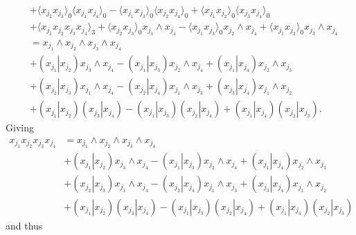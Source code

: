 \documentclass[aps, preprint]{revtex4}
\begin{document}
\begin{align}
 &  + \langle x_{j_{2}} x_{j_{3}} \rangle _{0}  \langle x_{j_{1}} x_{j_{4}} \rangle _{0} - \langle x_{j_{1}} x_{j_{3}} \rangle _{0}  \langle x_{j_{2}} x_{j_{4}} \rangle _{0} + \langle x_{j_{1}} x_{j_{2}} \rangle _{0}  \langle x_{j_{3}} x_{j_{4}} \rangle _{0} \\
 &  + \langle x_{j_{1}} x_{j_{2}} x_{j_{3}} x_{j_{4}} \rangle _{3} + \langle x_{j_{2}} x_{j_{3}} \rangle _{0} x_{j_{1}} \wedge x_{j_{4}} - \langle x_{j_{1}} x_{j_{3}} \rangle _{0} x_{j_{2}} \wedge x_{j_{4}} + \langle x_{j_{1}} x_{j_{2}} \rangle _{0} x_{j_{3}} \wedge x_{j_{4}} \nonumber  \\
 &  =x_{j_{1}} \wedge x_{j_{2}} \wedge x_{j_{3}} \wedge x_{j_{4}} \nonumber  \\
 &  +\left (\left .x_{j_{1}}\right \vert x_{j_{2}}\right ) x_{j_{3}} \wedge x_{j_{4}} -\left (\left .x_{j_{1}}\right \vert x_{j_{3}}\right ) x_{j_{2}} \wedge x_{j_{4}} +\left (\left .x_{j_{1}}\right \vert x_{j_{4}}\right ) x_{j_{2}} \wedge x_{j_{3}} \nonumber  \\
 &  +\left (\left .x_{j_{2}}\right \vert x_{j_{3}}\right ) x_{j_{1}} \wedge x_{j_{4}} -\left (\left .x_{j_{2}}\right \vert x_{j_{4}}\right ) x_{j_{1}} \wedge x_{j_{3}} +\left (\left .x_{j_{3}}\right \vert x_{j_{4}}\right ) x_{j_{1}} \wedge x_{j_{2}} \nonumber  \\
 &  +\left (\left .x_{j_{1}}\right \vert x_{j_{2}}\right ) \left (\left .x_{j_{3}}\right \vert x_{j_{4}}\right ) -\left (\left .x_{j_{1}}\right \vert x_{j_{3}}\right ) \left (\left .x_{j_{2}}\right \vert x_{j_{4}}\right ) +\left (\left .x_{j_{1}}\right \vert x_{j_{4}}\right ) \left (\left .x_{j_{2}}\right \vert x_{j_{3}}\right )\text{.}\end{align}Giving
\begin{align}x_{j_{1}} x_{j_{2}} x_{j_{3}} x_{j_{4}} &  =x_{j_{1}} \wedge x_{j_{2}} \wedge x_{j_{3}} \wedge x_{j_{4}} \nonumber  \\
 &  +\left (\left .x_{j_{1}}\right \vert x_{j_{2}}\right ) x_{j_{3}} \wedge x_{j_{4}} -\left (\left .x_{j_{1}}\right \vert x_{j_{3}}\right ) x_{j_{2}} \wedge x_{j_{4}} +\left (\left .x_{j_{1}}\right \vert x_{j_{4}}\right ) x_{j_{2}} \wedge x_{j_{3}} \nonumber  \\
 &  +\left (\left .x_{j_{2}}\right \vert x_{j_{3}}\right ) x_{j_{1}} \wedge x_{j_{4}} -\left (\left .x_{j_{2}}\right \vert x_{j_{4}}\right ) x_{j_{1}} \wedge x_{j_{3}} +\left (\left .x_{j_{3}}\right \vert x_{j_{4}}\right ) x_{j_{1}} \wedge x_{j_{2}} \nonumber  \\
 &  +\left (\left .x_{j_{1}}\right \vert x_{j_{2}}\right ) \left (\left .x_{j_{3}}\right \vert x_{j_{4}}\right ) -\left (\left .x_{j_{1}}\right \vert x_{j_{3}}\right ) \left (\left .x_{j_{2}}\right \vert x_{j_{4}}\right ) +\left (\left .x_{j_{1}}\right \vert x_{j_{4}}\right ) \left (\left .x_{j_{2}}\right \vert x_{j_{3}}\right )\end{align}and thus
\end{document}
